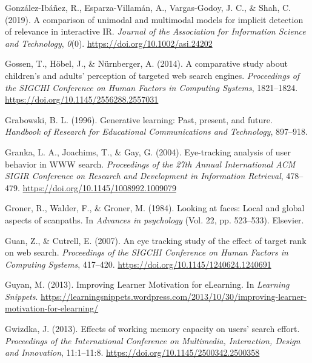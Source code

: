 \documentclass[letterpaper, nobind]{templates/ociamthesis}
\newlength{\cslhangindent}
\newenvironment{CSLReferences}[2] %
 {%
  \setlength{\parindent}{0pt}
  \ifodd #1
  \let\oldpar\par
  \def\par{\hangindent=\cslhangindent\oldpar}
  \fi
  \setlength{\parskip}{1mm}
  \setlength{\baselineskip}{6mm}
 }%
 {}
\begin{document}
\begin{CSLReferences}{1}{0}
\leavevmode{}%
González-Ibáñez, R., Esparza-Villamán, A., Vargas-Godoy, J. C., \& Shah, C. (2019). A comparison of unimodal and multimodal models for implicit detection of relevance in interactive {IR}. \emph{Journal of the Association for Information Science and Technology}, \emph{0}(0). \url{https://doi.org/10.1002/asi.24202}

\leavevmode{}%
Gossen, T., Höbel, J., \& Nürnberger, A. (2014). A comparative study about children's and adults' perception of targeted web search engines. \emph{Proceedings of the {SIGCHI} Conference on Human Factors in Computing Systems}, 1821--1824. \url{https://doi.org/10.1145/2556288.2557031}

\leavevmode{}%
Grabowski, B. L. (1996). Generative learning: Past, present, and future. \emph{Handbook of Research for Educational Communications and Technology}, 897--918.

\leavevmode{}%
Granka, L. A., Joachims, T., \& Gay, G. (2004). Eye-tracking analysis of user behavior in {WWW} search. \emph{Proceedings of the 27th Annual International {ACM SIGIR} Conference on Research and Development in Information Retrieval}, 478--479. \url{https://doi.org/10.1145/1008992.1009079}

\leavevmode{}%
Groner, R., Walder, F., \& Groner, M. (1984). Looking at faces: Local and global aspects of scanpaths. In \emph{Advances in psychology} (Vol. 22, pp. 523--533). Elsevier.

\leavevmode{}%
Guan, Z., \& Cutrell, E. (2007). An eye tracking study of the effect of target rank on web search. \emph{Proceedings of the {SIGCHI} Conference on Human Factors in Computing Systems}, 417--420. \url{https://doi.org/10.1145/1240624.1240691}

\leavevmode{}%
Guyan, M. (2013). Improving {Learner Motivation} for {eLearning}. In \emph{Learning Snippets}. \url{https://learningsnippets.wordpress.com/2013/10/30/improving-learner-motivation-for-elearning/}

\leavevmode{}%
Gwizdka, J. (2013). Effects of working memory capacity on users' search effort. \emph{Proceedings of the {International Conference} on {Multimedia}, {Interaction}, {Design} and {Innovation}}, 11:1--11:8. \url{https://doi.org/10.1145/2500342.2500358}


\end{CSLReferences}
\end{document}
